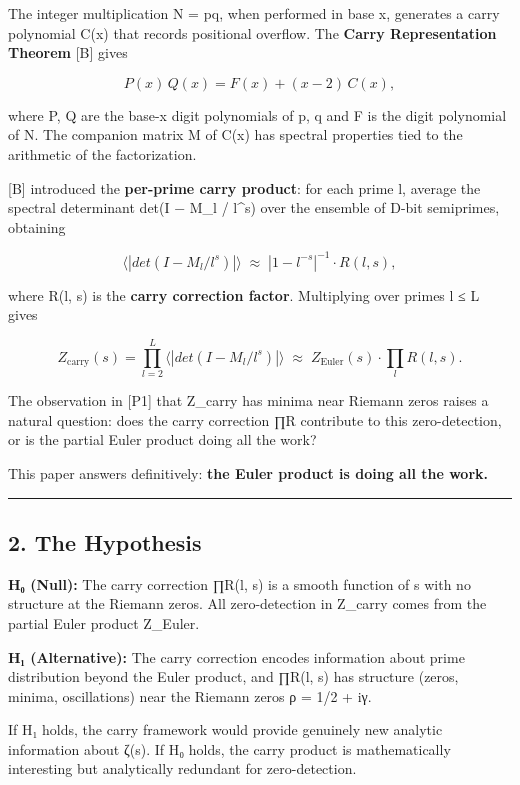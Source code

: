 \documentclass[
  11pt,
]{article}
\begin{document}
The integer multiplication N = pq, when performed in base x, generates a carry
polynomial C(x) that records positional overflow. The \textbf{Carry
Representation Theorem} {[}B{]} gives

\[P(x)\,Q(x) = F(x) + (x - 2)\,C(x),\]

where P, Q are the base-x digit polynomials of p, q and F is the digit
polynomial of N. The companion matrix M of C(x) has spectral properties tied to
the arithmetic of the factorization.

{[}B{]} introduced the \textbf{per-prime carry product}: for each prime l,
average the spectral determinant \textbar det(I − M\_l / l\^{}s)\textbar{} over
the ensemble of D-bit semiprimes, obtaining

\[\bigl\langle |det(I - M_l / l^s)| \bigr\rangle \;\approx\; |1 - l^{-s}|^{-1} \cdot R(l, s),\]

where R(l, s) is the \textbf{carry correction factor}. Multiplying over primes l
≤ L gives

\[Z_{\text{carry}}(s) = \prod_{l=2}^{L} \bigl\langle |det(I - M_l / l^s)| \bigr\rangle \;\approx\; Z_{\text{Euler}}(s) \cdot \prod_{l} R(l, s).\]

The observation in {[}P1{]} that Z\_carry has minima near Riemann zeros raises a
natural question: does the carry correction ∏R contribute to this
zero-detection, or is the partial Euler product doing all the work?

This paper answers definitively: \textbf{the Euler product is doing all the
work.}

\begin{center}\rule{0.5\linewidth}{0.5pt}\end{center}

\newpage

\subsection{2. The Hypothesis}\label{the-hypothesis}

\textbf{H₀ (Null):} The carry correction ∏R(l, s) is a smooth function of s with
no structure at the Riemann zeros. All zero-detection in Z\_carry comes from the
partial Euler product Z\_Euler.

\textbf{H₁ (Alternative):} The carry correction encodes information about prime
distribution beyond the Euler product, and ∏R(l, s) has structure (zeros,
minima, oscillations) near the Riemann zeros ρ = 1/2 + iγ.

If H₁ holds, the carry framework would provide genuinely new analytic
information about ζ(s). If H₀ holds, the carry product is mathematically
interesting but analytically redundant for zero-detection.
\end{document}
